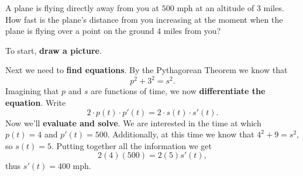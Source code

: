 \documentclass{ximera}
\begin{document}
\begin{example}
A plane is flying directly away from you at $500$ mph at an altitude
of $3$ miles.  How fast is the plane's distance from you increasing at
the moment when the plane is flying over a point on the ground $4$
miles from you?


\begin{explanation}
To start, \textbf{draw a picture}.
\begin{image}
\end{image}
Next we need to \textbf{find equations}. By the Pythagorean Theorem
we know that
\[
p^2+3^2=s^2.
\] 
Imagining that $p$ and $s$ are functions of time, we now
\textbf{differentiate the equation}. Write
\[
2\cdot p(t)\cdot p'(t)  = 2\cdot s(t) \cdot s'(t).
\] 
Now we'll \textbf{evaluate and solve}.  We
are interested in the time at which $p(t)=4$ and $p'(t) =
500$. Additionally, at this time we know that $4^2+9=s^2$, so
$s(t)=5$.  Putting together all the information we get
\[
2(4)(500)=2(5)s'(t),
\]
thus $s'(t)=400$ mph.
\end{explanation}
\end{example}
\end{document}
